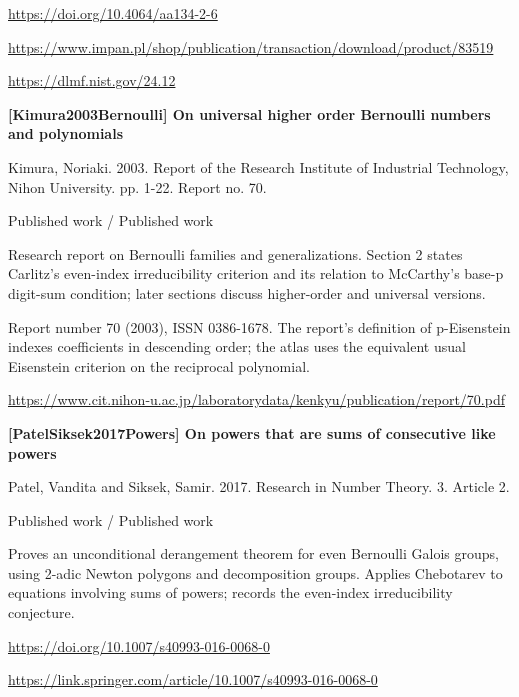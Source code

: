 \documentclass[11pt,a4paper,oneside,openany]{book}
\begin{document}
{\footnotesize\url{https://doi.org/10.4064/aa134-2-6}}\par
{\footnotesize\url{https://www.impan.pl/shop/publication/transaction/download/product/83519}}\par
{\footnotesize\url{https://dlmf.nist.gov/24.12}}\par
\vspace{9pt}
\hypertarget{ref:Kimura2003Bernoulli}{}
{\sffamily\bfseries\color{atlasgreen}[Kimura2003Bernoulli] On universal higher order Bernoulli numbers and polynomials}\par
\color{black} Kimura, Noriaki. 2003. Report of the Research Institute of Industrial Technology, Nihon University. pp. 1-22. Report no. 70.\par
{\small\sffamily\color{atlasgold}Published work / Published work}\par
\color{black} Research report on Bernoulli families and generalizations. Section 2 states Carlitz's even-index irreducibility criterion and its relation to McCarthy's base-p digit-sum condition; later sections discuss higher-order and universal versions.\par
{\small Report number 70 (2003), ISSN 0386-1678. The report's definition of p-Eisenstein indexes coefficients in descending order; the atlas uses the equivalent usual Eisenstein criterion on the reciprocal polynomial.}\par
{\footnotesize\url{https://www.cit.nihon-u.ac.jp/laboratorydata/kenkyu/publication/report/70.pdf}}\par
\vspace{9pt}
\hypertarget{ref:PatelSiksek2017Powers}{}
{\sffamily\bfseries\color{atlasgreen}[PatelSiksek2017Powers] On powers that are sums of consecutive like powers}\par
\color{black} Patel, Vandita and Siksek, Samir. 2017. Research in Number Theory. 3. Article 2.\par
{\small\sffamily\color{atlasgold}Published work / Published work}\par
\color{black} Proves an unconditional derangement theorem for even Bernoulli Galois groups, using 2-adic Newton polygons and decomposition groups. Applies Chebotarev to equations involving sums of powers; records the even-index irreducibility conjecture.\par
{\footnotesize\url{https://doi.org/10.1007/s40993-016-0068-0}}\par
{\footnotesize\url{https://link.springer.com/article/10.1007/s40993-016-0068-0}}\par
\end{document}
